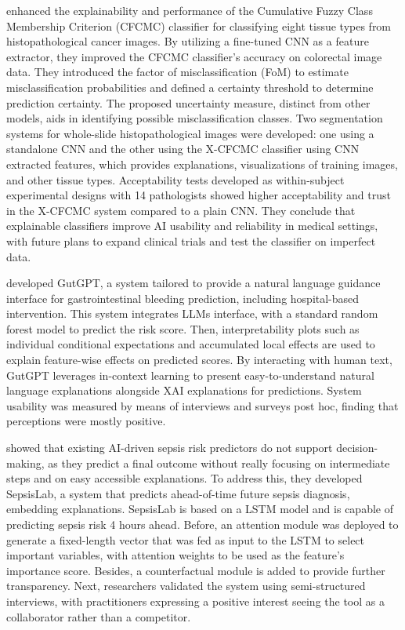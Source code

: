 \cite{sabol2020explainable} enhanced the explainability and performance of the Cumulative Fuzzy Class Membership Criterion (CFCMC) classifier for classifying eight tissue types from histopathological cancer images. By utilizing a fine-tuned CNN as a feature extractor, they improved the CFCMC classifier's accuracy on colorectal image data. They introduced the factor of misclassification (FoM) to estimate misclassification probabilities and defined a certainty threshold to determine prediction certainty. The proposed uncertainty measure, distinct from other models, aids in identifying possible misclassification classes. Two segmentation systems for whole-slide histopathological images were developed: one using a standalone CNN and the other using the X-CFCMC classifier using CNN extracted features, which provides explanations, visualizations of training images, and other tissue types. 
Acceptability tests developed as within-subject experimental designs with 14 pathologists showed higher acceptability and trust in the X-CFCMC system compared to a plain CNN. They conclude that explainable classifiers improve AI usability and reliability in medical settings, with future plans to expand clinical trials and test the classifier on imperfect data.

\cite{rajashekar2024human} developed GutGPT, a system tailored to provide a natural language guidance interface for gastrointestinal bleeding prediction, including hospital-based intervention. This system integrates LLMs interface, with a standard random forest model to predict the risk score. Then, interpretability plots such as individual conditional expectations and accumulated local effects are used to explain feature-wise effects on predicted scores. By interacting with human text, GutGPT leverages in-context learning to present easy-to-understand natural language explanations alongside XAI explanations for predictions. 
System usability was measured by means of interviews and surveys post hoc, finding that perceptions were mostly positive. 


\cite{zhang2024rethinking} showed that existing AI-driven sepsis risk predictors do not support decision-making, as they predict a final outcome without really focusing on intermediate steps and on easy accessible explanations. To address this, they developed SepsisLab, a system that predicts ahead-of-time future sepsis diagnosis, embedding explanations. SepsisLab is based on a LSTM model and is capable of predicting sepsis risk 4 hours ahead. Before, an attention module was deployed to generate a fixed-length vector that was fed as input to the LSTM to select important variables, with attention weights to be used as the feature's importance score. Besides, a counterfactual module is added to provide further transparency. Next, researchers validated the system using semi-structured interviews, with practitioners expressing a positive interest seeing the tool as a collaborator rather than a competitor. 


